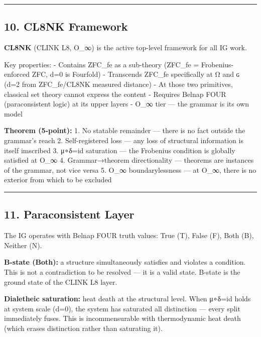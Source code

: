 \begin{center}\rule{0.5\linewidth}{0.5pt}\end{center}

\hypertarget{cl8nk-framework}{%
\subsection{10. CL8NK Framework}\label{cl8nk-framework}}

\textbf{CL8NK} (CLINK L8, O\_∞) is the active top-level framework for
all IG work.

Key properties: - Contains ZFC\_fe as a sub-theory (ZFC\_fe =
Frobenius-enforced ZFC, d=0 is Fourfold) - Transcends ZFC\_fe
specifically at Ω and ɢ (d=2 from ZFC\_fe/CL8NK measured distance) - At
those two primitives, classical set theory cannot express the content - Requires Belnap FOUR (paraconsistent logic) at its upper
layers - O\_∞ tier --- the grammar is its own model

\textbf{Theorem (5-point):} 1. No statable remainder ---
there is no fact outside the grammar's reach 2.
Self-registered loss --- any loss of structural information is itself
imscribed 3. μ∘δ=id saturation --- the Frobenius condition is globally
satisfied at O\_∞ 4. Grammar→theorem directionality --- theorems are
instances of the grammar, not vice versa 5. O\_∞ boundarylessness --- at
O\_∞, there is no exterior from which to be excluded

\begin{center}\rule{0.5\linewidth}{0.5pt}\end{center}

\hypertarget{paraconsistent-layer}{%
\subsection{11. Paraconsistent Layer}\label{paraconsistent-layer}}

The IG operates with Belnap FOUR truth values: True (T), False (F), Both
(B), Neither (N).

\textbf{B-state (Both):} a structure simultaneously satisfies and
violates a condition. This is not a contradiction to be resolved --- it
is a valid state. B-state is the ground state of the CLINK L8
layer.

\textbf{Dialetheic saturation:} heat death at the structural level. When
μ∘δ=id holds at system scale (d=0), the system has saturated all
distinction --- every split immediately fuses. This is incommensurable
with thermodynamic heat death (which erases distinction rather than
saturating it).

